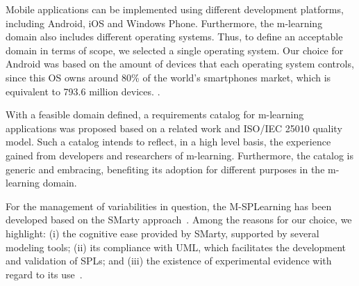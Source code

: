 Mobile applications can be implemented using different development platforms, including Android, iOS and Windows Phone. Furthermore, the m-learning domain also includes different operating systems. Thus, to define an acceptable domain in terms of scope, we selected a single operating system. Our choice for Android was based on the amount of devices that each operating system controls, since this OS owns around 80\% of the world's smartphones market, which is equivalent to 793.6 million devices. \cite{llamas14}.

With a feasible domain defined, a requirements catalog for m-learning applications was proposed based on a related work \cite{filho13} and ISO/IEC 25010 quality model. Such a catalog intends to reflect, in a high level basis, the experience gained from developers and researchers of m-learning. Furthermore, the catalog is generic and embracing, benefiting its adoption for different purposes in the m-learning domain. 

For the management of variabilities in question, the M-SPLearning has been developed based on the SMarty approach~\cite{oliveirajr10}. Among the reasons for our choice, we highlight: (i) the cognitive ease provided by SMarty, supported by several modeling tools; (ii) its compliance with UML, which facilitates the development and validation of SPLs; and (iii) the existence of experimental evidence with regard to its use~\cite{marcolino13, marcolino14a, marcolino14b, bera15}. 

